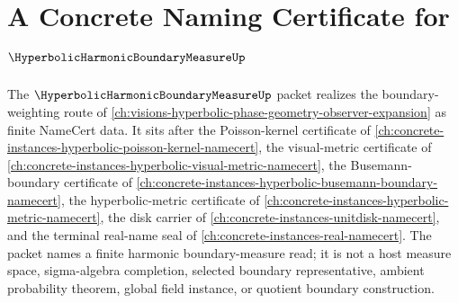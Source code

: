 \chapter{A Concrete Naming Certificate for $\HyperbolicHarmonicBoundaryMeasureUp$}
\label{ch:concrete-instances-hyperbolic-harmonic-boundary-measure-namecert}

The $\HyperbolicHarmonicBoundaryMeasureUp$ packet realizes the boundary-weighting route of \autoref{ch:visions-hyperbolic-phase-geometry-observer-expansion} as finite NameCert data. It sits after the Poisson-kernel certificate of \autoref{ch:concrete-instances-hyperbolic-poisson-kernel-namecert}, the visual-metric certificate of \autoref{ch:concrete-instances-hyperbolic-visual-metric-namecert}, the Busemann-boundary certificate of \autoref{ch:concrete-instances-hyperbolic-busemann-boundary-namecert}, the hyperbolic-metric certificate of \autoref{ch:concrete-instances-hyperbolic-metric-namecert}, the disk carrier of \autoref{ch:concrete-instances-unitdisk-namecert}, and the terminal real-name seal of \autoref{ch:concrete-instances-real-namecert}. The packet names a finite harmonic boundary-measure read; it is not a host measure space, sigma-algebra completion, selected boundary representative, ambient probability theorem, global field instance, or quotient boundary construction.

